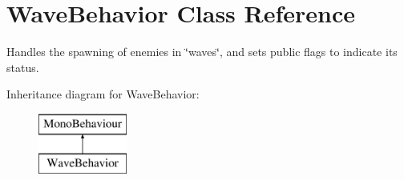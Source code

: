 \hypertarget{class_wave_behavior}{}\section{Wave\+Behavior Class Reference}
\label{class_wave_behavior}


Handles the spawning of enemies in \char`\"{}waves\char`\"{}, and sets public flags to indicate its status.  


Inheritance diagram for Wave\+Behavior\+:\begin{figure}[H]
\begin{center}
\leavevmode
\includegraphics[height=2.000000cm]{class_wave_behavior}
\end{center}
\end{figure}
